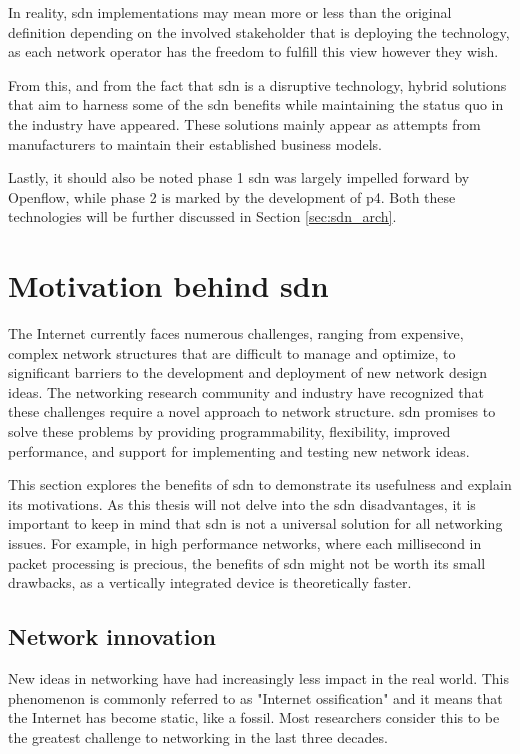 In reality, \gls{sdn} implementations may mean more or less than the original definition depending on the involved stakeholder that is deploying the technology, as each network operator has the freedom to fulfill this view however they wish\cite{peterson_software-defined_2021}. 

From this, and from the fact that \gls{sdn} is a disruptive technology, hybrid solutions that aim to harness some of the \gls{sdn} benefits while maintaining the status quo in the industry have appeared\cite{peterson_software-defined_2021}. These solutions mainly appear as attempts from manufacturers to maintain their established business models. 

Lastly, it should also be noted phase 1 \gls{sdn} was largely impelled forward by Openflow, while phase 2 is marked by the development of \gls{p4}. Both these technologies will be further discussed in Section \ref{sec:sdn_arch}.


\section[Motivation behind SDN]{Motivation behind \gls{sdn}}

The Internet currently faces numerous challenges, ranging from expensive, complex network structures that are difficult to manage and optimize, to significant barriers to the development and deployment of new network design ideas. The networking research community and industry have recognized that these challenges require a novel approach to network structure. \gls{sdn} promises to solve these problems by providing programmability, flexibility, improved performance, and support for implementing and testing new network ideas.

This section explores the benefits of \gls{sdn} to demonstrate its usefulness and explain its motivations. As this thesis will not delve into the \gls{sdn} disadvantages, it is important to keep in mind that \gls{sdn} is not a universal solution for all networking issues. For example, in high performance networks, where each millisecond in packet processing is precious, the benefits of \gls{sdn} might not be worth its small drawbacks, as a vertically integrated device is theoretically faster\cite{nunes_survey_2014}. 

\subsection{Network innovation}
New ideas in networking have had increasingly less impact in the real world. This phenomenon is commonly referred to as "Internet ossification" and it means that the Internet has become static, like a fossil\cite{nunes_survey_2014}. Most researchers consider this to be the greatest challenge to networking in the last three decades.

